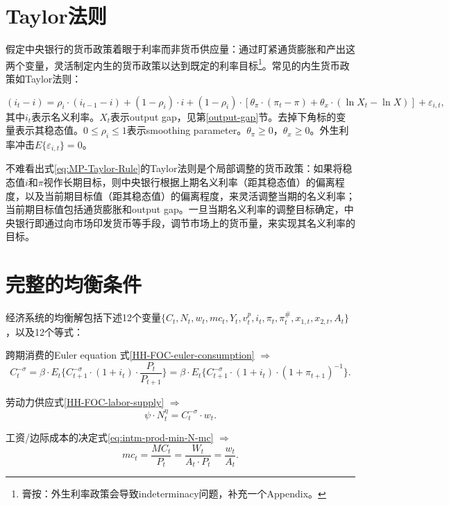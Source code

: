 \section{Taylor法则}
\label{seq:Taylor-Rule}
假定中央银行的货币政策着眼于利率而非货币供应量：通过盯紧通货膨胀和产出这两个变量，灵活制定内生的货币政策以达到既定的利率目标\footnote{膏按：外生利率政策会导致indeterminacy问题，补充一个Appendix。}。常见的内生货币政策如Taylor法则：

\begin{equation}
  \label{eq:MP-Taylor-Rule}
  (i_t-i) = \rho_i \cdot (i_{t-1}-i) + (1-\rho_i) \cdot i+ (1-\rho_i) \cdot \left[
    \theta_{\pi} \cdot (\pi_t - \pi) + \theta_{x} \cdot (\ln X_t - \ln X)
  \right] + \varepsilon_{i,t},
\end{equation}
其中$i_t$表示名义利率。$X_t$表示output gap，见第\ref{output-gap}节。去掉下角标的变量表示其稳态值。$0 \le \rho_i \le 1$表示smoothing parameter。$\theta_\pi \ge 0$，$\theta_{x} \ge 0$。外生利率冲击$E\{ \varepsilon_{i,t}\} = 0$。

不难看出式\eqref{eq:MP-Taylor-Rule}的Taylor法则是个局部调整的货币政策：如果将稳态值$i$和$\pi$视作长期目标，则中央银行根据上期名义利率（距其稳态值）的偏离程度，以及当前期目标值（距其稳态值）的偏离程度，来灵活调整当期的名义利率；当前期目标值包括通货膨胀和output gap。一旦当期名义利率的调整目标确定，中央银行即通过向市场印发货币等手段，调节市场上的货币量，来实现其名义利率的目标。

\section{完整的均衡条件}
\label{sec:full-set-equilibrium-conditions}
经济系统的均衡解包括下述12个变量$\{ C_t, N_t, w_t, mc_t, Y_t, v^p_t, i_t, \pi_t, \pi^{\#}_t, x_{1,t}, x_{2,t}, A_t \}$，以及12个等式：

跨期消费的Euler equation 式\eqref{HH-FOC-euler-consumption} $\Rightarrow$
\begin{equation*}
    C_t^{-\sigma} = \beta \cdot E_t\{ C_{t+1}^{-\sigma} \cdot (1+i_t) \cdot \frac{P_t}{P_{t+1}}\}=\beta \cdot E_t\{ C_{t+1}^{-\sigma} \cdot (1+i_t) \cdot ( 1+\pi_{t+1} )^{-1}\}.
\end{equation*}

劳动力供应式\eqref{HH-FOC-labor-supply} $\Rightarrow$
\begin{equation*}
    \psi \cdot N_t^{\eta} = C_t^{-\sigma} \cdot w_t.
\end{equation*}

工资/边际成本的决定式\eqref{eq:intm-prod-min-N-mc} $\Rightarrow$
\begin{equation*}
    mc_t = \frac{MC_t}{P_t} = \frac{W_t}{A_t \cdot P_t} = \frac{w_t}{A_t}.
\end{equation*}

